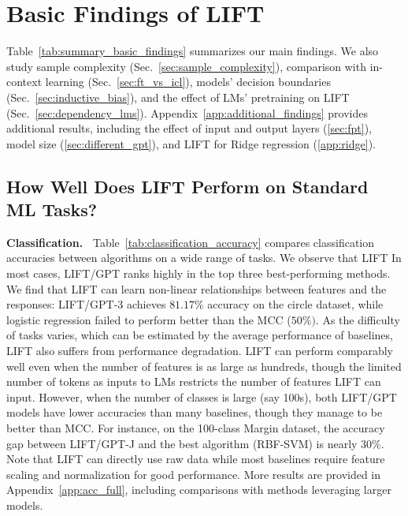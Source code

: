 \section{Basic Findings of \textsc{LIFT}}
\label{sec:lift_basics}

Table~\ref{tab:summary_basic_findings} summarizes our main findings. We also study sample complexity (Sec.~\ref{sec:sample_complexity}),
comparison with in-context learning (Sec.~\ref{sec:ft_vs_icl}),
models' decision boundaries (Sec.~\ref{sec:inductive_bias}),
and the effect of LMs' pretraining on \textsc{LIFT} (Sec.~\ref{sec:dependency_lms}).
Appendix~\ref{app:additional_findings} provides additional results, including the effect of input and output layers (\ref{sec:fpt}), model size (\ref{sec:different_gpt}), and \textsc{LIFT} for Ridge regression (\ref{app:ridge}).

\subsection{How Well Does \textsc{LIFT} Perform on Standard ML Tasks?}
\label{sec:performance}

\textbf{Classification.~}
Table~\ref{tab:classification_accuracy} compares classification accuracies between algorithms on a wide range of tasks. We observe that \textsc{LIFT}  In most cases, \textsc{LIFT}/GPT ranks highly in the top three best-performing methods. We find that \textsc{LIFT} can learn non-linear relationships between features and the responses:
\textsc{LIFT}/GPT-3 achieves $81.17\%$ accuracy on the circle dataset, while logistic regression failed to perform better than the MCC ($50\%)$.
As the difficulty of tasks varies, which can be estimated by the average performance of baselines, \textsc{LIFT} also suffers from performance degradation. 
\textsc{LIFT} can perform comparably well even when the number of features is as large as hundreds, though the limited number of tokens as inputs to LMs restricts the number of features \textsc{LIFT} can input. However, when the number of classes is large (say 100s), both \textsc{LIFT}/GPT models have lower accuracies than many baselines, though they manage to be better than MCC. For instance, on the 100-class Margin dataset, the accuracy gap between \textsc{LIFT}/GPT-J and the best algorithm (RBF-SVM)  is nearly 30\%.
Note that \textsc{LIFT} can directly use raw data while most baselines require feature scaling and normalization for good performance. More results are provided in Appendix~\ref{app:acc_full}, including comparisons with methods leveraging larger models. 

